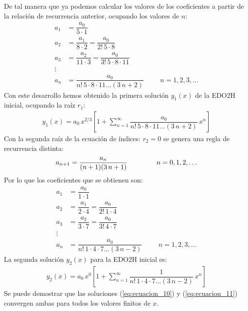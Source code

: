 De tal manera que ya podemos calcular los valores de los coeficientes a partir de la relación de recurrencia anterior, ocupando los valores de $n$:
\begin{align*}
a_{1} &= \dfrac{a_{0}}{5 \cdot 1} \\[0.5em]
a_{2} &= \dfrac{a_{1}}{8 \cdot 2} = \dfrac{a_{0}}{2! \, 5 \cdot 8} \\[0.5em]
a_{3} &= \dfrac{a_{2}}{11 \cdot 3} = \dfrac{a_{0}}{3! \, 5 \cdot 8 \cdot 11} \\
\vdots \\[0.5em]
a_{n} &= \dfrac{a_{0}}{n! \, 5 \cdot 8 \cdot 11 \ldots (3\, n + 2)} \hspace{1cm} n = 1, 2, 3, \ldots
\end{align*}
Con este desarrollo hemos obtenido la primera solución $y_{1}(x)$ de la EDO2H inicial, ocupando la raíz $r_{1}$:
\begin{align}
y_{1} (x)= a_{0} \, x^{2/3} \left[ 1 + \sum_{n=1}^{\infty} \dfrac{a_{0}}{n! \, 5 \cdot 8 \cdot 11 \ldots (3\, n + 2)} \, x^{n} \right]
\label{eq:ecuacion_10}    
\end{align}
Con la segunda raíz de la ecuación de índices: $r_{2} = 0$ se genera una regla de recurrencia distinta:
\begin{align}
a_{n+1} = \dfrac{a_{n}}{(n+1)(3 \, n + 1)} \hspace{1.5cm} n = 0, 1, 2, \ldots
\label{eq:ecuacion_09}    
\end{align}
Por lo que los coeficientes que se obtienen son:
\begin{align*}
a_{1} &= \dfrac{a_{0}}{1 \cdot 1} \\[0.5em]
a_{2} &= \dfrac{a_{1}}{2 \cdot 4} = \dfrac{a_{0}}{2! \, 1 \cdot 4}  \\[0.5em]
a_{3} &= \dfrac{a_{2}}{3 \cdot 7} = \dfrac{a_{0}}{3! \, 4 \cdot 7}  \\[0.5em]
\vdots \\
a_{n} &= \dfrac{a_{0}}{n! \, 1 \cdot 4 \cdot 7 \ldots (3 \, n - 2)} \hspace{1cm} n = 1, 2, 3, \ldots
\end{align*}
La segunda solución $y_{2}(x)$ para la EDO2H inicial es:
\begin{align}
y_{2} (x)= a_{0} \, x^{0} \left[ 1 + \sum_{n=1}^{\infty} \dfrac{1}{n! \, 1 \cdot 4 \cdot 7 \ldots (3\, n - 2)} \, x^{n} \right]
\label{eq:ecuacion_11}
\end{align}    
Se puede demostrar que las soluciones (\ref{eq:ecuacion_10}) y (\ref{eq:ecuacion_11}) convergen ambas para todos los valores finitos de $x$.
